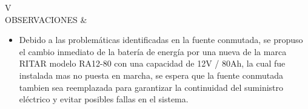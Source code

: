 \begin{longtblr}
	 \unit{\volt} \\
	OBSERVACIONES &
	 \begin{itemize}
		\item Debido a las problemáticas identificadas en la fuente conmutada, se propuso el cambio inmediato de la batería de energía por una nueva de la marca RITAR modelo RA12-80 con una capacidad de 12V / 80Ah, la cual fue instalada mas no puesta en marcha, se espera que la fuente conmutada tambien sea reemplazada para garantizar la continuidad del suministro eléctrico y evitar posibles fallas en el sistema.
	\end{itemize} \\
\end{longtblr}

